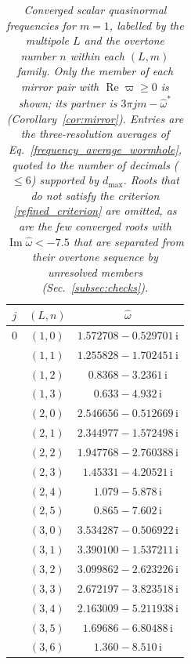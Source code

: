 \begin{table}[H]
\caption{\textit{Converged scalar quasinormal frequencies for $m=1$, labelled by the multipole $L$ and the overtone number $n$ within each $(L,m)$ family. Only the member of each mirror pair with $\operatorname{Re}\varpi\geq0$ is shown; its partner is $3\pi jm-\widehat{\omega}^{*}$ (Corollary~\ref{cor:mirror}). Entries are the three-resolution averages of Eq.~\eqref{frequency_average_wormhole}, quoted to the number of decimals ($\leq6$) supported by $d_{\max}$. Roots that do not satisfy the criterion \eqref{refined_criterion} are omitted, as are the few converged roots with $\operatorname{Im}\widehat{\omega}<-7.5$ that are separated from their overtone sequence by unresolved members (Sec.~\ref{subsec:checks}).}}
\label{tab:qnm-m1}
\centering
\begingroup
\scriptsize
\setlength{\tabcolsep}{3.0pt}
\setlength{\arrayrulewidth}{0.4pt}
\renewcommand{\arraystretch}{1.08}
\begin{minipage}[t]{0.325\textwidth}
\centering
\begin{tabular}[t]{|c|c|c|}
\hline
$j$ & $(L,n)$ & $\widehat{\omega}$ \\
\hline
$0$ & $(1,0)$ & $1.572708-0.529701\,\mathrm{i}$ \\
 & $(1,1)$ & $1.255828-1.702451\,\mathrm{i}$ \\
 & $(1,2)$ & $0.8368-3.2361\,\mathrm{i}$ \\
 & $(1,3)$ & $0.633-4.932\,\mathrm{i}$ \\
 & $(2,0)$ & $2.546656-0.512669\,\mathrm{i}$ \\
 & $(2,1)$ & $2.344977-1.572498\,\mathrm{i}$ \\
 & $(2,2)$ & $1.947768-2.760388\,\mathrm{i}$ \\
 & $(2,3)$ & $1.45331-4.20521\,\mathrm{i}$ \\
 & $(2,4)$ & $1.079-5.878\,\mathrm{i}$ \\
 & $(2,5)$ & $0.865-7.602\,\mathrm{i}$ \\
 & $(3,0)$ & $3.534287-0.506922\,\mathrm{i}$ \\
 & $(3,1)$ & $3.390100-1.537211\,\mathrm{i}$ \\
 & $(3,2)$ & $3.099862-2.623226\,\mathrm{i}$ \\
 & $(3,3)$ & $2.672197-3.823518\,\mathrm{i}$ \\
 & $(3,4)$ & $2.163009-5.211938\,\mathrm{i}$ \\
 & $(3,5)$ & $1.69686-6.80488\,\mathrm{i}$ \\
 & $(3,6)$ & $1.360-8.510\,\mathrm{i}$ \\

\end{tabular}
\end{minipage}
\end{table}

